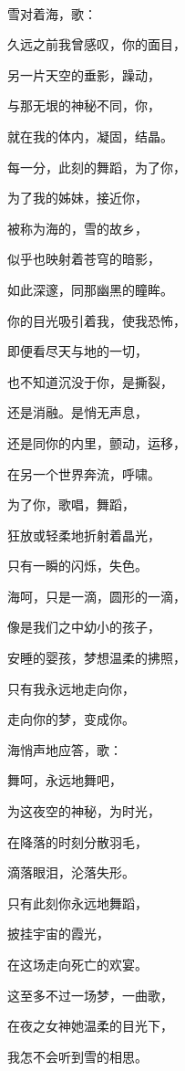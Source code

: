 \documentclass[UTF8]{article}
\begin{document}
\\[0.6cm]
\par 雪对着海，歌：
\\[0.6cm]
\par 久远之前我曾感叹，你的面目，
\par 另一片天空的垂影，躁动，
\par 与那无垠的神秘不同，你，
\par 就在我的体内，凝固，结晶。
\par 每一分，此刻的舞蹈，为了你，
\par 为了我的姊妹，接近你，
\par 被称为海的，雪的故乡，
\par 似乎也映射着苍穹的暗影，
\par 如此深邃，同那幽黑的瞳眸。
\par 你的目光吸引着我，使我恐怖，
\par 即便看尽天与地的一切，
\par 也不知道沉没于你，是撕裂，
\par 还是消融。是悄无声息，
\par 还是同你的内里，颤动，运移，
\par 在另一个世界奔流，呼啸。
\par 为了你，歌唱，舞蹈，
\par 狂放或轻柔地折射着晶光，
\par 只有一瞬的闪烁，失色。
\par 海呵，只是一滴，圆形的一滴，
\par 像是我们之中幼小的孩子，
\par 安睡的婴孩，梦想温柔的拂照，
\par 只有我永远地走向你，
\par 走向你的梦，变成你。
\\[0.6cm]
\par 海悄声地应答，歌：
\\[0.6cm]
\par 舞呵，永远地舞吧，
\par 为这夜空的神秘，为时光，
\par 在降落的时刻分散羽毛，
\par 滴落眼泪，沦落失形。
\par 只有此刻你永远地舞蹈，
\par 披挂宇宙的霞光，
\par 在这场走向死亡的欢宴。
\par 这至多不过一场梦，一曲歌，
\par 在夜之女神她温柔的目光下，
\par 我怎不会听到雪的相思。
\end{document}
